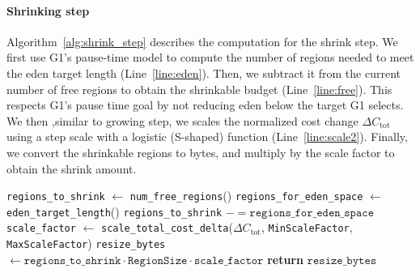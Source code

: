 \paragraph{\textbf{Shrinking step}}
Algorithm~\ref{alg:shrink_step} describes the computation for the shrink step.
We first use G1’s pause-time model to compute the number of regions needed to meet the eden target length (Line~\ref{line:eden}).
Then, we subtract it from the current number of free regions to obtain the shrinkable budget (Line~\ref{line:free}).
This respects G1’s pause time goal by not reducing eden below the target G1 selects.
We then ,similar to growing step, we scales the normalized cost change $\Delta C_{\text{tot}}$ using a step scale with a logistic (S-shaped) function (Line~\ref{line:scale2}).
Finally, we convert the shrinkable regions to bytes, and multiply by the scale factor to obtain the shrink amount.

\begin{algorithm}[h]
	\caption{Shrinking step}
	\label{alg:shrink_step}
	\begin{algorithmic}[1]
		\State \texttt{regions\_to\_shrink} \(\gets\) \texttt{num\_free\_regions}()
		\State \texttt{regions\_for\_eden\_space} \(\gets\) \texttt{eden\_target\_length}() \label{line:eden}
		\State \texttt{regions\_to\_shrink} \(\mathrel{-}= \texttt{regions\_for\_eden\_space}\) \label{line:free}
		\State \texttt{scale\_factor} \(\gets\) \texttt{scale\_total\_cost\_delta}(\(\Delta C_{\text{tot}}\), \texttt{MinScaleFactor}, \texttt{MaxScaleFactor}) \label{line:scale2}
		\State \texttt{resize\_bytes} \(\gets \texttt{regions\_to\_shrink} \cdot \texttt{RegionSize} \cdot \texttt{scale\_factor}\)
		\State \textbf{return} \(\texttt{resize\_bytes}\)
		\EndProcedure
	\end{algorithmic}
\end{algorithm}

